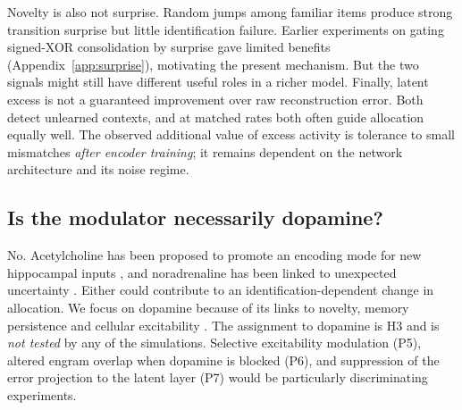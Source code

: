 \documentclass[11pt,a4paper]{article}
\begin{document}
Novelty is also not surprise. Random jumps among familiar items produce strong transition surprise but little identification failure. Earlier experiments on gating signed-XOR consolidation by surprise gave limited benefits (Appendix~\ref{app:surprise}), motivating the present mechanism. But the two signals might still have different useful roles in a richer model. Finally, latent excess is not a guaranteed improvement over raw reconstruction error. Both detect unlearned contexts, and at matched rates both often guide allocation equally well. The observed additional value of excess activity is tolerance to small mismatches \emph{after encoder training}; it remains dependent on the network architecture and its noise regime.

\subsection{Is the modulator necessarily dopamine?}
No. Acetylcholine has been proposed to promote an encoding mode for new hippocampal inputs \citep{hasselmo2006}, and noradrenaline has been linked to unexpected uncertainty \citep{yu2005}. Either could contribute to an identification-dependent change in allocation. We focus on dopamine because of its links to novelty, memory persistence and cellular excitability \citep{duszkiewicz2019,takeuchi2016,durstewitz2008,kutter2026}. The assignment to dopamine is H3 and is \emph{not tested} by any of the simulations. Selective excitability modulation (P5), altered engram overlap when dopamine is blocked (P6), and suppression of the error projection to the latent layer (P7) would be particularly discriminating experiments.
\end{document}

